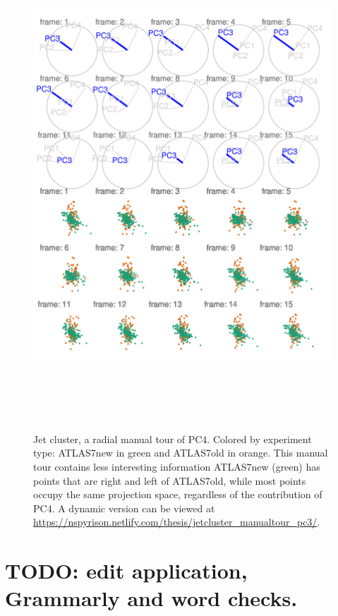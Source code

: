 \documentclass{monashthesis}
\theoremstyle{definition}
\theoremstyle{definition}
\theoremstyle{definition}
\theoremstyle{remark}
\begin{document}
\begin{figure}

{\centering \includegraphics[width=6in,height=7.2in]{./figures/JetClusterBad} 

}

\caption{Jet cluster, a radial manual tour of PC4.
Colored by experiment type: ATLAS7new in green and ATLAS7old in orange.
This manual tour contains less interesting information ATLAS7new (green)
has points that are right and left of ATLAS7old, while most points
occupy the same projection space, regardless of the contribution of PC4.
A dynamic version can be viewed at
\url{https://nspyrison.netlify.com/thesis/jetcluster_manualtour_pc3/}.}\label{fig:JetClusterBad}
\end{figure}

\section{TODO: edit application, Grammarly and word
checks.}\label{todo-edit-application-grammarly-and-word-checks.}
\end{document}
